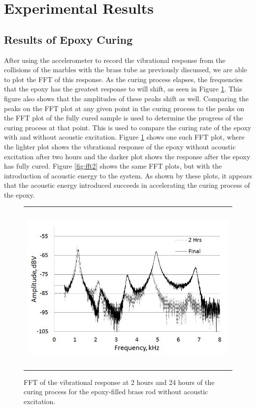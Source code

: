 \documentclass[a4paper]{spie}  %
\begin{document}
\section{Experimental Results}

\subsection{Results of Epoxy Curing}
After using the accelerometer to record the vibrational response from the collisions of the marbles with the brass tube as previously discussed, we are able to plot the FFT of this response. As the curing process elapses, the frequencies that the epoxy has the greatest response to will shift, as seen in Figure \ref{fig:fft1}. This figure also shows that the amplitudes of these peaks shift as well. Comparing the peaks on the FFT plot at any given point in the curing process to the peaks on the FFT plot of the fully cured sample is used to determine the progress of the curing process at that point. This is used to compare the curing rate of the epoxy with and without acoustic excitation. Figure \ref{fig:fft1} shows one such FFT plot, where the lighter plot shows the vibrational response of the epoxy without acoustic excitation after two hours and the darker plot shows the response after the epoxy has fully cured. Figure \ref{fig:fft2} shows the same FFT plots, but with the introduction of acoustic energy to the system. As shown by these plots, it appears that the acoustic energy introduced succeeds in accelerating the curing process of the epoxy.

\begin{figure}[h!]
\begin{center}
\begin{tabular}{c}
\includegraphics[height=8.5cm]{fft1}
\end{tabular}
\end{center}
\caption[example] 
{ \label{fig:fft1} 
   FFT of the vibrational response at 2 hours and 24 hours of the curing process for the epoxy-filled brass rod without acoustic excitation.}
\end{figure} 
   
\end{document}
